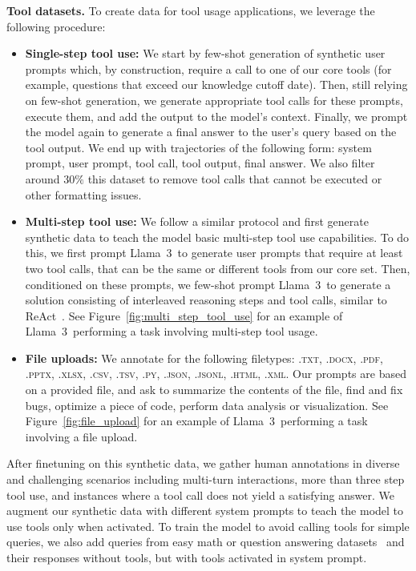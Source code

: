 \textbf{Tool datasets.} To create data for tool usage applications, we leverage the following procedure:

\begin{itemize}
    \item \textbf{Single-step tool use:} We start by few-shot generation of synthetic user prompts which, by construction, require a call to one of our core tools (for example, questions that exceed our knowledge cutoff date). Then, still relying on few-shot generation, we generate appropriate tool calls for these prompts, execute them, and add the output to the model's context. Finally, we prompt the model again to generate a final answer to the user's query based on the tool output. We end up with trajectories of the following form: system prompt, user prompt, tool call, tool output, final answer. We also filter around $30\%$ this dataset to remove tool calls that cannot be executed or other formatting issues. 

    \item \textbf{Multi-step tool use:} We follow a similar protocol and first generate synthetic data to teach the model basic multi-step tool use capabilities. To do this, we first prompt Llama~3~to generate user prompts that require at least two tool calls, that can be the same or different tools from our core set. Then, conditioned on these prompts, we few-shot prompt Llama~3~to generate a solution consisting of interleaved reasoning steps and tool calls, similar to ReAct~\citep{yao2022react}. See Figure~\ref{fig:multi_step_tool_use} for an example of Llama~3~performing a task involving multi-step tool usage. 

    \item \textbf{File uploads:} We annotate for the following filetypes: \textsc{.txt, .docx, .pdf, .pptx, .xlsx, .csv, .tsv, .py, .json, .jsonl, .html, .xml}. Our prompts are based on a provided file, and ask to summarize the contents of the file, find and fix bugs, optimize a piece of code, perform data analysis or visualization. See Figure~\ref{fig:file_upload} for an example of Llama~3~performing a task involving a file upload. 
\end{itemize}

After finetuning on this synthetic data, we gather human annotations in diverse and challenging scenarios including multi-turn interactions, more than three step tool use, and instances where a tool call does not yield a satisfying answer. We augment our synthetic data with different system prompts to teach the model to use tools only when activated. To train the model to avoid calling tools for simple queries, we also add queries from easy math or question answering datasets~\citep{berant-etal-2013-semantic,koncel2016mawps,joshi-etal-2017-triviaqa,amini2019mathqa} and their responses without tools, but with tools activated in system prompt. 

